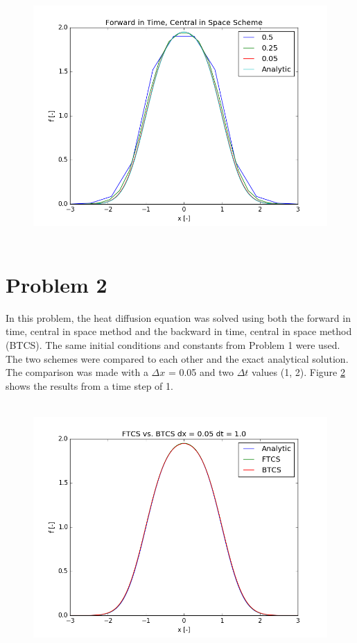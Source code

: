 \documentclass[12pt]{article}
\begin{document}
\begin{figure}[H]
	\centering
	\includegraphics[height=3.75in]{problem1.png}
	\label{fig:problem1}
\end{figure}





\section{Problem 2}

\noindent In this problem, the heat diffusion equation was solved using both the forward in time, central in space method and the backward in time, central in space method (BTCS). The same initial conditions and constants from Problem 1 were used. The two schemes were compared to each other and the exact analytical solution. The comparison was made with a $\Delta x$ = 0.05 and two $\Delta t$ values (1, 2). Figure \ref{fig:problem2a} shows the results from a time step of 1.

\begin{figure}[H]
	\centering
	\includegraphics[height=3.75in]{problem2a.png}
	\label{fig:problem2a}
\end{figure}
\end{document}

